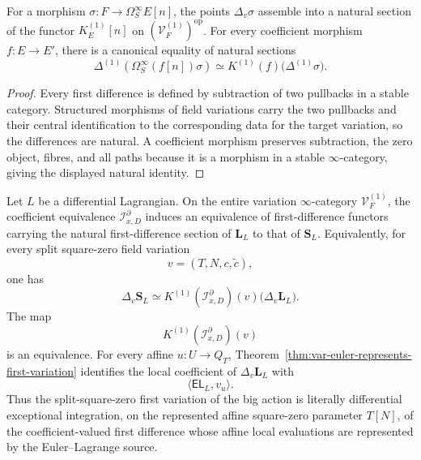 \begin{proposition}
\label{prop:var-first-difference-natural-category}
For a morphism \(\sigma:F\to\Omega_S^\infty E[n]\), the points \(\Delta_v\sigma\) assemble into a natural section of the functor \(K_E^{(1)}[n]\) on \((\mathcal V_F^{(1)})^{\mathrm{op}}\). For every coefficient morphism \(f:E\to E'\), there is a canonical equality of natural sections
\[
    \boxed{
    \Delta^{(1)}(\Omega_S^\infty(f[n])\sigma)
    \simeq
    K^{(1)}(f)\bigl(\Delta^{(1)}\sigma\bigr).
    }
\]
\end{proposition}

\begin{proof}
Every first difference is defined by subtraction of two pullbacks in a stable category. Structured morphisms of field variations carry the two pullbacks and their central identification to the corresponding data for the target variation, so the differences are natural. A coefficient morphism preserves subtraction, the zero object, fibres, and all paths because it is a morphism in a stable \(\infty\)-category, giving the displayed natural identity.
\end{proof}

\begin{theorem}
\label{thm:var-action-first-variation}
Let \(L\) be a differential Lagrangian. On the entire variation \(\infty\)-category \(\mathcal V_F^{(1)}\), the coefficient equivalence \(\mathcal I^\partial_{x,D}\) induces an equivalence of first-difference functors carrying the natural first-difference section of \(\mathbf L_L\) to that of \(\mathbf S_L\). Equivalently, for every split square-zero field variation
\[
    v=(T,N,c,\widetilde c),
\]
one has
\[
    \boxed{
    \Delta_v\mathbf S_L
    \simeq
    K^{(1)}(\mathcal I^\partial_{x,D})(v)
    \bigl(
      \Delta_v\mathbf L_L
    \bigr).
    }
\]
The map
\[
    K^{(1)}(\mathcal I^\partial_{x,D})(v)
\]
is an equivalence. For every affine \(u:U\to Q_T\), Theorem~\ref{thm:var-euler-represents-first-variation} identifies the local coefficient of \(\Delta_v\mathbf L_L\) with
\[
    \langle\mathsf{EL}_L,v_u\rangle.
\]
Thus the split-square-zero first variation of the big action is literally differential exceptional integration, on the represented affine square-zero parameter \(T[N]\), of the coefficient-valued first difference whose affine local evaluations are represented by the Euler--Lagrange source.
\end{theorem}

